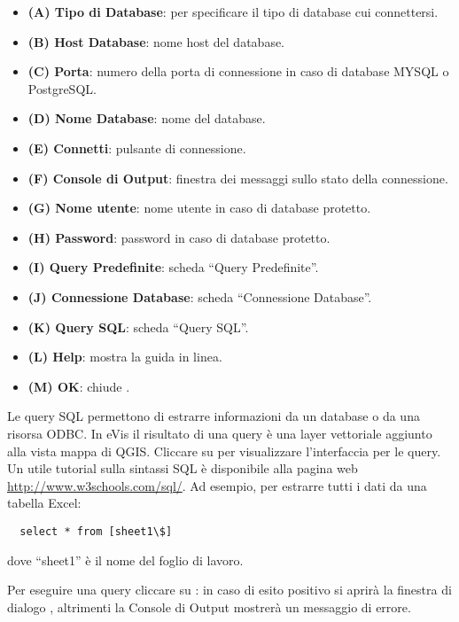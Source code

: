 \begin{itemize}[label=--]
\item \textbf{(A) Tipo di Database}: per specificare il tipo di database cui connettersi.
\item \textbf{(B) Host Database}: nome host del database.
\item \textbf{(C) Porta}: numero della porta di connessione in caso di database MYSQL o PostgreSQL.
\item \textbf{(D) Nome Database}: nome del database.
\item \textbf{(E) Connetti}:  pulsante di connessione.
\item \textbf{(F) Console di Output}: finestra dei messaggi sullo stato della connessione.
\item \textbf{(G) Nome utente}: nome utente in caso di database protetto.
\item \textbf{(H) Password}: password in caso di database protetto.
\item \textbf{(I) Query Predefinite}: scheda ``Query Predefinite''.
\item \textbf{(J) Connessione Database}: scheda ``Connessione Database''.
\item \textbf{(K) Query SQL}: scheda ``Query SQL''.
\item \textbf{(L) Help}: mostra la guida in linea.
\item \textbf{(M) OK}: chiude .
\end{itemize}

\label{evis_running_sql}

Le query SQL permettono di estrarre informazioni da un database o da una risorsa ODBC. In eVis il 
risultato di una query è una layer vettoriale aggiunto alla vista mappa di QGIS.
Cliccare su  per visualizzare l'interfaccia per le query. Un utile tutorial sulla 
sintassi SQL è disponibile alla pagina web \url{http://www.w3schools.com/sql/}. 
Ad esempio, per estrarre tutti i dati da una tabella Excel:

\begin{verbatim}
  select * from [sheet1\$]
\end{verbatim} 

dove ``sheet1'' è il nome del foglio di lavoro.

Per eseguire una query cliccare su : in caso di esito positivo si aprirà la finestra di
dialogo , altrimenti la Console di Output mostrerà un messaggio di errore.

